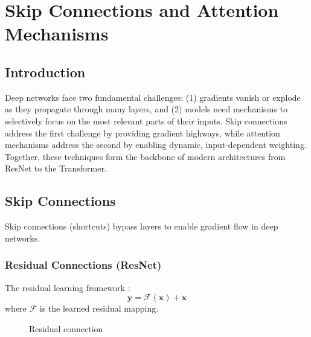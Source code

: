 ﻿\clearpage
\cleardoublepage

\chapter{Skip Connections and Attention Mechanisms}

\section{Introduction}

Deep networks face two fundamental challenges: (1) gradients vanish or explode as they propagate through many layers, and (2) models need mechanisms to selectively focus on the most relevant parts of their inputs. Skip connections address the first challenge by providing gradient highways, while attention mechanisms address the second by enabling dynamic, input-dependent weighting. Together, these techniques form the backbone of modern architectures from ResNet to the Transformer.

\section{Skip Connections}

Skip connections (shortcuts) bypass layers to enable gradient flow in deep networks.

\subsection{Residual Connections (ResNet)}

The residual learning framework \cite{he2016deep}:
\begin{equation}
\mathbf{y} = \mathcal{F}(\mathbf{x}) + \mathbf{x}
\end{equation}
where $\mathcal{F}$ is the learned residual mapping.

\begin{figure}[htbp]
    \centering
    \caption{Residual connection}
    \label{fig:residual}
\end{figure}

